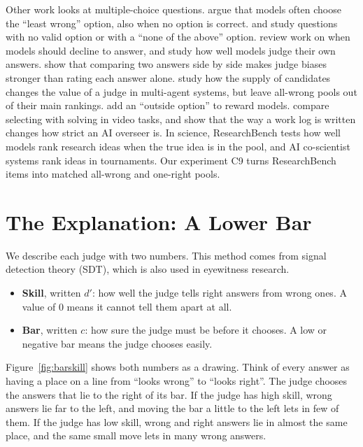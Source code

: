 \documentclass[10pt,twocolumn]{article}
\begin{document}
Other work looks at multiple-choice questions. \citet{wang2025llms} argue that models often choose the ``least wrong'' option, also when no option is correct. \citet{kim2026penalty} and \citet{tam2025none} study questions with no valid option or with a ``none of the above'' option. \citet{wen2025know} review work on when models should decline to answer, and \citet{kadavath2022language} study how well models judge their own answers. \citet{jeong2025comparative} show that comparing two answers side by side makes judge biases stronger than rating each answer alone. \citet{ji2026candidate} study how the supply of candidates changes the value of a judge in multi-agent systems, but leave all-wrong pools out of their main rankings. \citet{rho2025best} add an ``outside option'' to reward models. \citet{ma2026selecting} compare selecting with solving in video tasks, and \citet{chen2026beyond} show that the way a work log is written changes how strict an AI overseer is. In science, ResearchBench \citep{liu2025researchbench} tests how well models rank research ideas when the true idea is in the pool, and AI co-scientist systems \citep{gottweis2025towards} rank ideas in tournaments. Our experiment C9 turns ResearchBench items into matched all-wrong and one-right pools.

\section{The Explanation: A Lower Bar}
\label{sec:account}
We describe each judge with two numbers. This method comes from signal detection theory (SDT), which is also used in eyewitness research.
\begin{itemize}\setlength{\itemsep}{1pt}
\item \textbf{Skill}, written $d'$: how well the judge tells right answers from wrong ones. A value of 0 means it cannot tell them apart at all.
\item \textbf{Bar}, written $c$: how sure the judge must be before it chooses. A low or negative bar means the judge chooses easily.
\end{itemize}

Figure~\ref{fig:barskill} shows both numbers as a drawing. Think of every answer as having a place on a line from ``looks wrong'' to ``looks right''. The judge chooses the answers that lie to the right of its bar. If the judge has high skill, wrong answers lie far to the left, and moving the bar a little to the left lets in few of them. If the judge has low skill, wrong and right answers lie in almost the same place, and the same small move lets in many wrong answers.
\end{document}
